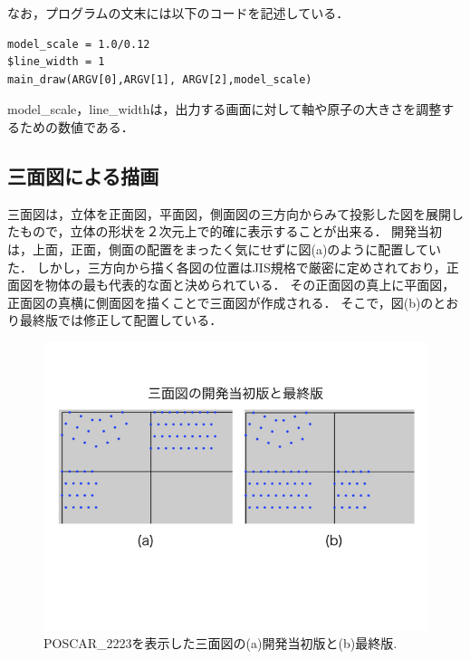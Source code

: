 なお，プログラムの文末には以下のコードを記述している．
\begin{lstlisting}[style=customRuby,basicstyle={\scriptsize\ttfamily}]
model_scale = 1.0/0.12
$line_width = 1
main_draw(ARGV[0],ARGV[1], ARGV[2],model_scale)
\end{lstlisting}
model\_scale，line\_widthは，出力する画面に対して軸や原子の大きさを調整するための数値である．

\subsection{三面図による描画}
三面図は，立体を正面図，平面図，側面図の三方向からみて投影した図を展開したもので，立体の形状を２次元上で的確に表示することが出来る．
開発当初は，上面，正面，側面の配置をまったく気にせずに図(a)のように配置していた．
しかし，三方向から描く各図の位置はJIS規格で厳密に定めされており，正面図を物体の最も代表的な面と決められている\cite{ThreeViewDrawing}．
その正面図の真上に平面図，正面図の真横に側面図を描くことで三面図が作成される．
そこで，図(b)のとおり最終版では修正して配置している．

\begin{figure}[htbp]\begin{center}
\includegraphics[width=12cm,bb= 0 0 937 753]{../figs/./boundary_narita.014.jpeg}
\caption{POSCAR\_2223を表示した三面図の(a)開発当初版と(b)最終版.}
\label{default}\end{center}\end{figure}
